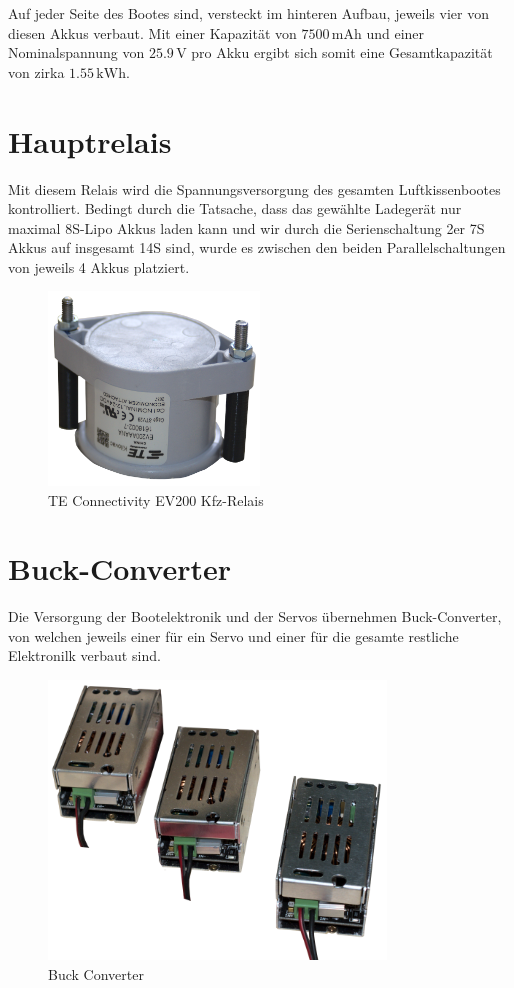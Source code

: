 Auf jeder Seite des Bootes sind, versteckt im hinteren Aufbau, jeweils vier von diesen Akkus verbaut. Mit einer Kapazität von $7500\,\textrm{mAh}$ und einer Nominalspannung von $25.9\,\mathrm{V}$ pro Akku ergibt sich somit eine Gesamtkapazität von zirka $1.55\,\mathrm{kWh}$.

\newpage
\section{Hauptrelais}
Mit diesem Relais wird die Spannungsversorgung des gesamten Luftkissenbootes kontrolliert. Bedingt durch die Tatsache, dass das gewählte Ladegerät nur maximal 8S-Lipo Akkus laden kann und wir durch die Serienschaltung 2er 7S Akkus auf insgesamt 14S sind, 
wurde es zwischen den beiden Parallelschaltungen von jeweils 4 Akkus platziert. 
\begin{figure}[h]
    \centering
    \includegraphics[width=0.5\textwidth]{Fotos/Hauptrelais.png}
    \caption{TE Connectivity EV200 Kfz-Relais}
\end{figure}

\newpage
\section{Buck-Converter}
Die Versorgung der Bootelektronik und der Servos übernehmen Buck-Converter, von welchen jeweils einer für ein Servo und einer für die gesamte restliche Elektronilk verbaut sind.
\begin{figure}[h]
    \centering
    \includegraphics[width=0.8\textwidth]{Fotos/Buck_Converter.png}
    \caption{Buck Converter}
\end{figure}
\newpage

